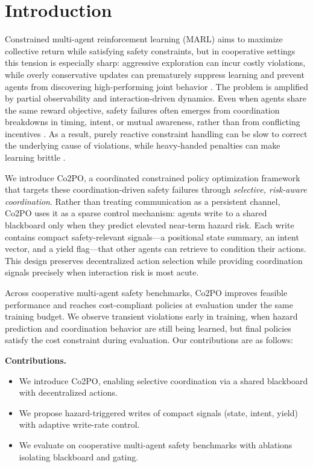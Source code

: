 \documentclass{article}
\theoremstyle{plain}
\theoremstyle{definition}
\theoremstyle{remark}
\begin{document}
\section{Introduction}
\label{sec:intro}

Constrained multi-agent reinforcement learning (MARL) aims to maximize collective return while satisfying safety constraints, but in cooperative settings this tension is especially sharp: aggressive exploration can incur costly violations, while overly conservative updates can prematurely suppress learning and prevent agents from discovering high-performing joint behavior \cite{brunke2022safelearning}. The problem is amplified by partial observability and interaction-driven dynamics. Even when agents share the same reward objective, safety failures often emerges from coordination breakdowns in timing, intent, or mutual awareness, rather than from conflicting incentives \cite{omidshafiei2015decentralizedcontrolpartiallyobservable, calzolari2026safeheterogeneousmultiagentrl}. As a result, purely reactive constraint handling can be slow to correct the underlying cause of violations, while heavy-handed penalties can make learning brittle \cite{brunke2022safelearning}.

We introduce Co2PO, a coordinated constrained policy optimization framework that targets these coordination-driven safety failures through \emph{selective, risk-aware coordination}. Rather than treating communication as a persistent channel, Co2PO uses it as a sparse control mechanism: agents write to a shared blackboard only when they predict elevated near-term hazard risk. Each write contains compact safety-relevant signals---a positional state summary, an intent vector, and a yield flag---that other agents can retrieve to condition their actions. This design preserves decentralized action selection while providing coordination signals precisely when interaction risk is most acute.

Across cooperative multi-agent safety benchmarks, Co2PO improves feasible performance and reaches cost-compliant policies at evaluation under the same training budget. We observe transient violations early in training, when hazard prediction and coordination behavior are still being learned, but final policies satisfy the cost constraint during evaluation. Our contributions are as follows:

\noindent\textbf{Contributions.}\par
\begin{itemize}\setlength\topsep{0pt}\setlength\itemsep{5pt}\setlength\parskip{0pt}\setlength\parsep{0pt}
  \item We introduce Co2PO, enabling selective coordination via a shared blackboard with decentralized actions.
  \item We propose hazard-triggered writes of compact signals (state, intent, yield) with adaptive write-rate control.
  \item We evaluate on cooperative multi-agent safety benchmarks with ablations isolating blackboard and gating.
\end{itemize}
\end{document}
